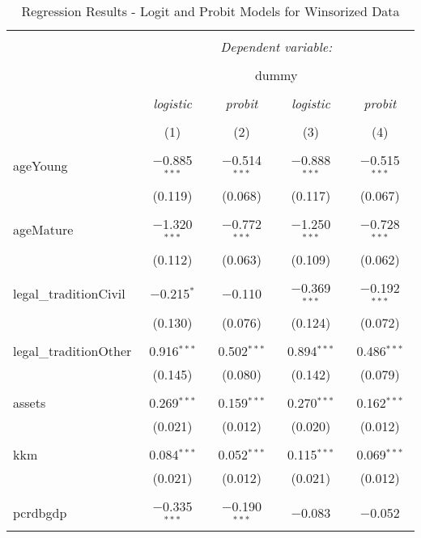 \documentclass[a4paper,nobind]{templates/ociamthesis}
\begin{document}
\begin{table}[!htbp] \centering 
  \caption{Regression Results - Logit and Probit Models for Winsorized Data} 
  \label{} 
\footnotesize 
\begin{tabular}{@{\extracolsep{5pt}}lcccc} 
\\[-1.8ex]\hline 
\hline \\[-1.8ex] 
 & \multicolumn{4}{c}{\textit{Dependent variable:}} \\ 
\cline{2-5} 
\\[-1.8ex] & \multicolumn{4}{c}{dummy} \\ 
\\[-1.8ex] & \textit{logistic} & \textit{probit} & \textit{logistic} & \textit{probit} \\ 
\\[-1.8ex] & (1) & (2) & (3) & (4)\\ 
\hline \\[-1.8ex] 
 ageYoung & $-$0.885$^{***}$ & $-$0.514$^{***}$ & $-$0.888$^{***}$ & $-$0.515$^{***}$ \\ 
  & (0.119) & (0.068) & (0.117) & (0.067) \\ 
  & & & & \\ 
 ageMature & $-$1.320$^{***}$ & $-$0.772$^{***}$ & $-$1.250$^{***}$ & $-$0.728$^{***}$ \\ 
  & (0.112) & (0.063) & (0.109) & (0.062) \\ 
  & & & & \\ 
 legal\_traditionCivil & $-$0.215$^{*}$ & $-$0.110 & $-$0.369$^{***}$ & $-$0.192$^{***}$ \\ 
  & (0.130) & (0.076) & (0.124) & (0.072) \\ 
  & & & & \\ 
 legal\_traditionOther & 0.916$^{***}$ & 0.502$^{***}$ & 0.894$^{***}$ & 0.486$^{***}$ \\ 
  & (0.145) & (0.080) & (0.142) & (0.079) \\ 
  & & & & \\ 
 assets & 0.269$^{***}$ & 0.159$^{***}$ & 0.270$^{***}$ & 0.162$^{***}$ \\ 
  & (0.021) & (0.012) & (0.020) & (0.012) \\ 
  & & & & \\ 
 kkm & 0.084$^{***}$ & 0.052$^{***}$ & 0.115$^{***}$ & 0.069$^{***}$ \\ 
  & (0.021) & (0.012) & (0.021) & (0.012) \\ 
  & & & & \\ 
 pcrdbgdp & $-$0.335$^{***}$ & $-$0.190$^{***}$ & $-$0.083 & $-$0.052 \\ 

\end{tabular}
\end{table}
\end{document}
